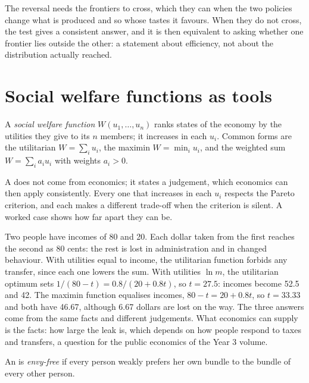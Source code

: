 The reversal needs the frontiers to cross, which they can when the two policies change what is produced
and so whose tastes it favours. When they do not cross, the test gives a consistent answer, and it is then
equivalent to asking whether one frontier lies outside the other: a statement about efficiency, not about
the distribution actually reached.

\section{Social welfare functions as tools}\label{sec:b2:social-choice:swf}

\begin{definition}\label{def:b2:social-choice:swf}
A \emph{social welfare function} $W(u_1, \dots, u_n)$ ranks states of the
economy by the utilities they give to its $n$ members; it increases in each $u_i$. Common forms are the
utilitarian $W = \sum_i u_i$, the maximin $W = \min_i u_i$, and the weighted sum $W = \sum_i a_i u_i$ with
weights $a_i > 0$.
\end{definition}

A  does not come from economics; it states a judgement, which economics can then
apply consistently. Every one that increases in each $u_i$ respects the Pareto criterion, and each makes a
different trade-off when the criterion is silent. A worked case shows how far apart they can be.

Two people have incomes of 80 and 20. Each dollar taken from the first reaches the second as 80 cents: the
rest is lost in administration and in changed behaviour. With utilities equal to income, the utilitarian
function forbids any transfer, since each one lowers the sum. With utilities $\ln m$, the utilitarian
optimum sets $1/(80 - t) = 0.8/(20 + 0.8t)$, so $t = 27.5$: incomes become 52.5 and 42. The maximin
function equalises incomes, $80 - t = 20 + 0.8t$, so $t = 33.33$ and both have 46.67, although 6.67 dollars
are lost on the way. The three answers come from the same facts and different judgements. What economics
can supply is the facts: how large the leak is, which depends on how people respond to taxes and
transfers, a question for the public economics of the Year 3 volume.

\begin{definition}\label{def:b2:social-choice:envy-free}
An  is \emph{envy-free} if every person weakly prefers her own bundle
to the bundle of every other person.
\end{definition}

